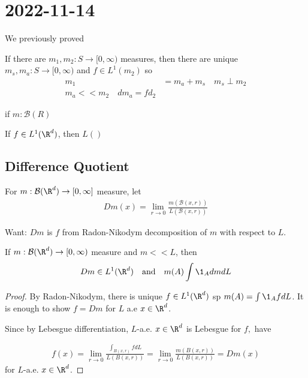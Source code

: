 \section{2022-11-14}

We previously proved 

\begin{theorem}
	If there are $m_1, m_2 : S \to [0, \infty)$ measures, then there are unique $m_s, m_a : S \to [0, \infty)$ and $f \in L^{1} (m_2)$ so
	\begin{align*}
		m_1 &= m_a + m_s \quad m_s \perp m_2 \\
		m_a << m_2 \quad d m_a = f d_2
	\end{align*} 

\end{theorem}


\begin{theorem}
		if $m : \mathcal{B}(R)$
\end{theorem}

\begin{theorem}
	If $f \in L^{1} (\R^d)$, then $L ()$
\end{theorem}

\subsection{Difference Quotient}

\begin{definition}
	For $m: \mathcal{B}(\R^d) \to [0, \infty]$ measure,
	let 
	\begin{align*}
		D m (x) = \lim_{r \to 0} \frac{m ( \mathcal{B} (x, r))}{L(\mathcal{B}(x, r))}
	\end{align*} 

	Want: $D m$ is $f$ from Radon-Nikodym decomposition of $m$ with respect to $L$.
\end{definition}

\begin{theorem}
	If $m: \mathcal{B}(\R^d) \to [0, \infty)$ measure and $m << L$, then 
	\begin{align*}
		D m \in L^{1} (\R^d) \quad \text{and} \quad m(A) \int \1_A dm dL
	\end{align*} 
\end{theorem}

\begin{proof}
	By Radon-Nikodym, there is unique $f \in L^1(\R^d)$ sp $m(A) = \int \1_A f dL$.
	It is enough to show  $f = D m$ for $L$ a.e $x \in \R^d$.

	Since  by Lebesgue differentiation, $L$-a.e. $x \in \R^d$ is Lebesgue for $f,$ have

	\begin{align*}
		f(x) = \lim_{r \to 0} \frac{\int_{B(x, r)} f dL}{L(B(x,r))} = \lim_{r \to 0} \frac{m(B(x,r))}{L(B(x,r))} = D m(x)
	\end{align*} 
	for $L$-a.e. $x \in \R^d$.
\end{proof}

